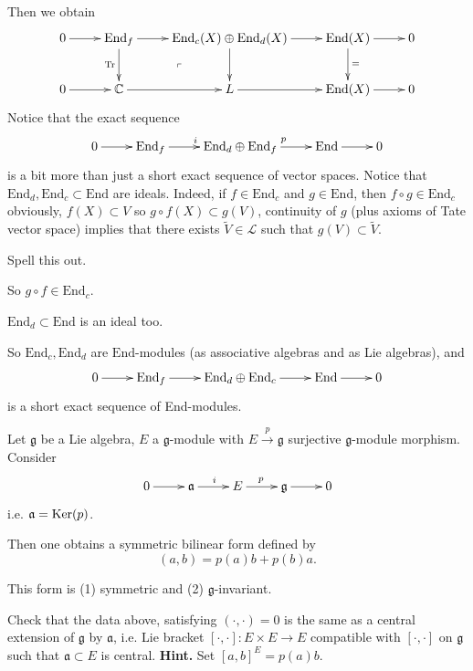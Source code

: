 Then we obtain
$$
\xymatrix{
0\ar[r]&\text{End}_f\ar[r]\ar[d]_{\text{Tr}}
\ar@{}[dr]|-{\ulcorner}&
\text{End}_c(X) \oplus
\text{End}_d(X)\ar[d]\ar[r]&
\text{End}(X)\ar[r]\ar[d]^{=}&0\\
0 \ar[r]&\mathbb{C}\ar[r]& L\ar[r]&
\text{End}(X)\ar[r]&0
}
$$
\medskip\noindent
Notice that the exact sequence
$$
\xymatrix{
0\ar[r]&\text{End}_f\ar[r]^i
&\text{End}_d \oplus \text{End}_f\ar[r]^p
&\text{End}\ar[r]&0
}
$$
is a bit more than
just a short exact sequence of vector spaces.
Notice that $\text{End}_d,\text{End}_c
\subset \text{End}$
are ideals.
Indeed,
if $f \in \text{End}_c$ and $g \in
\text{End}$,
then $f \circ g \in \text{End}_c$ obviously,
$f(X) \subset V$ so $g \circ f (X) \subset
g(V)$,
continuity of $g$
(plus axioms of Tate vector space)
implies that there exists $\widetilde{V} \in
\mathcal{L}$
such that $g(V) \subset \widetilde{V}$.

\begin{exercise}
\label{exercise-spell-this-out}
Spell this out.
\end{exercise}

So $g \circ f \in \text{End}_c$.

\begin{exercise}
\label{exercise-ideal-too}
$\text{End}_d \subset \text{End}$ is an ideal
too.
\end{exercise}

So $\text{End}_c, \text{End}_d$ are
$\text{End}$-modules
(as associative algebras and as Lie
algebras),
and
$$
\xymatrix{
0\ar[r]&\text{End}_f\ar[r]&\text{End}_d
\oplus \text{End}_c\ar[r]&
\text{End}\ar[r]&0
}
$$
is a short exact sequence of End-modules.

\medskip\noindent
Let $\mathfrak{g}$ be a Lie algebra, $E$ a
$\mathfrak{g}$-module
with $E \xrightarrow{p}\mathfrak{g}$
surjective
$\mathfrak{g}$-module morphism.
Consider
$$
\xymatrix{
0\ar[r]&\mathfrak{a}\ar[r]^i&E\ar[r]^p&
\mathfrak{g}\ar[r]&0
}
$$
i.e. $\mathfrak{a}=\mathop{\mathrm{Ker}}(p)$.

Then one obtains a symmetric bilinear form
defined by
$$
(a,b)=p(a)b+p(b)a.
$$
\begin{exercise}
\label{exercise-bilinear-form-extension}
This form is (1) symmetric and
(2) $\mathfrak{g}$-invariant.
\end{exercise}

\begin{exercise}
\label{exercise-central-extension}
Check that the data above,
satisfying $(\cdot,\cdot)=0$
is the same as a central extension of
$\mathfrak{g}$
by $\mathfrak{a}$,
i.e. Lie bracket $[\cdot,\cdot]:E \times E
\to E$
compatible with $[\cdot,\cdot]$ on
$\mathfrak{g}$
such that $\mathfrak{a}\subset E$
is central.
{\bf Hint.} Set $[a,b]^E=p(a)b$.
\end{exercise}


